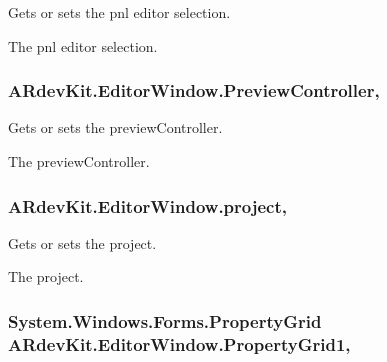 Gets or sets the pnl editor selection. 

The pnl editor selection. \hypertarget{class_a_rdev_kit_1_1_editor_window_ae57e383a1684241c86a5253d1fd8197a}{
\subsubsection[{Preview\-Controller}]{ A\-Rdev\-Kit.\-Editor\-Window.\-Preview\-Controller\hspace{0.3cm}{\ttfamily [get]}, {\ttfamily [set]}}}\label{class_a_rdev_kit_1_1_editor_window_ae57e383a1684241c86a5253d1fd8197a}


Gets or sets the preview\-Controller. 

The preview\-Controller. \hypertarget{class_a_rdev_kit_1_1_editor_window_aa7e64c912e3d904fae0ec52588be0baa}{
\subsubsection[{project}]{ A\-Rdev\-Kit.\-Editor\-Window.\-project\hspace{0.3cm}{\ttfamily [get]}, {\ttfamily [set]}}}\label{class_a_rdev_kit_1_1_editor_window_aa7e64c912e3d904fae0ec52588be0baa}


Gets or sets the project. 

The project. \hypertarget{class_a_rdev_kit_1_1_editor_window_a8f5f7c03bcb123e147d07b5023a60292}{
\subsubsection[{Property\-Grid1}]{\setlength{\rightskip}{0pt plus 5cm}System.\-Windows.\-Forms.\-Property\-Grid A\-Rdev\-Kit.\-Editor\-Window.\-Property\-Grid1\hspace{0.3cm}{\ttfamily [get]}, {\ttfamily [set]}}}\label{class_a_rdev_kit_1_1_editor_window_a8f5f7c03bcb123e147d07b5023a60292}


